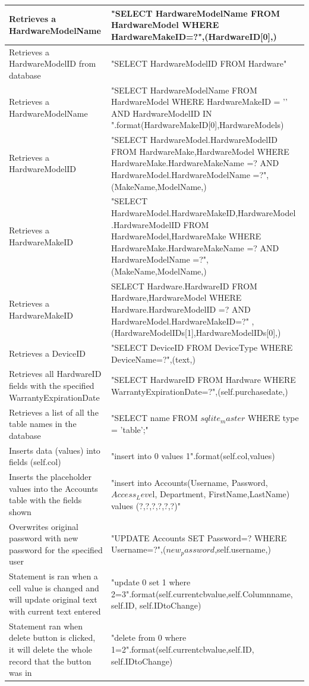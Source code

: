 \begin{center}
\begin{longtable}{|p{5cm}|p{7cm}|}
Retrieves a HardwareModelName & "SELECT HardwareModelName FROM HardwareModel WHERE HardwareMakeID=?",(HardwareID[0],) \\ \hline
Retrieves a HardwareModelID from database & "SELECT HardwareModelID FROM Hardware" \\ \hline
Retrieves a HardwareModelName & "SELECT HardwareModelName FROM HardwareModel WHERE HardwareMakeID = '{}' AND HardwareModelID IN {}".format(HardwareMakeID[0],HardwareModels) \\ \hline
Retrieves a HardwareModelID & "SELECT HardwareModel.HardwareModelID FROM HardwareMake,HardwareModel WHERE HardwareMake.HardwareMakeName =? AND HardwareModel.HardwareModelName =?",(MakeName,ModelName,) \\ \hline
Retrieves a HardwareMakeID & "SELECT HardwareModel.HardwareMakeID,HardwareModel .HardwareModelID FROM HardwareModel,HardwareMake WHERE HardwareMake.HardwareMakeName =? AND HardwareModelName =?",(MakeName,ModelName,) \\ \hline
Retrieves a HardwareMakeID & SELECT Hardware.HardwareID FROM Hardware,HardwareModel WHERE Hardware.HardwareModelID =? AND HardwareModel.HardwareMakeID=?" ,(HardwareModelIDs[1],HardwareModelIDs[0],)  \\ \hline
Retrieves a DeviceID & "SELECT DeviceID FROM DeviceType WHERE DeviceName=?",(text,) \\ \hline
Retrieves all HardwareID fields with the specified WarrantyExpirationDate & "SELECT HardwareID FROM Hardware WHERE WarrantyExpirationDate=?",(self.purchasedate,) \\ \hline
Retrieves a list of all the table names in the database &  "SELECT name FROM $sqlite_master$ WHERE type = 'table';" \\ \hline


Inserts data (values) into fields (self.col) & "insert into {0} values {1}".format(self.col,values) \\ \hline
Inserts the placeholder values into the Accounts table with the fields shown & "insert into Accounts(Username, Password, $Access_Leve$l, Department, FirstName,LastName) values (?,?,?,?,?,?)" \\ \hline
Overwrites original password with new password for the specified user &  "UPDATE Accounts SET Password=? WHERE Username=?",($new_password$,self.username,) \\ \hline
Statement is ran when a cell value is changed and will update original text with current text entered & "update {0} set {1} where {2}={3}".format(self.currentcbvalue,self.Columnname, self.ID, self.IDtoChange) \\ \hline

Statement ran when delete button is clicked, it will delete the whole record that the button was in & "delete from {0} where {1}={2}".format(self.currentcbvalue,self.ID, self.IDtoChange) \\ \hline

\end{longtable}
\end{center}

